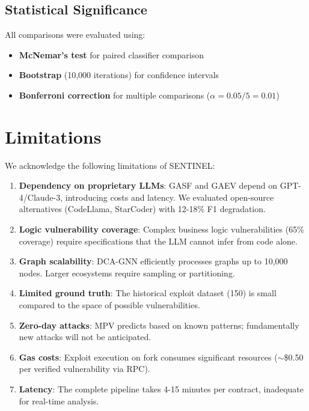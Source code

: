 \documentclass[11pt]{article}
\theoremstyle{definition}
\theoremstyle{plain}
\theoremstyle{remark}
\begin{document}
\subsection{Statistical Significance}

All comparisons were evaluated using:
\begin{itemize}
    \item \textbf{McNemar's test} for paired classifier comparison
    \item \textbf{Bootstrap} (10,000 iterations) for confidence intervals
    \item \textbf{Bonferroni correction} for multiple comparisons ($\alpha = 0.05/5 = 0.01$)
\end{itemize}

\section{Limitations}
\label{sec:limitations}

We acknowledge the following limitations of SENTINEL:

\begin{enumerate}
    \item \textbf{Dependency on proprietary LLMs}: GASF and GAEV depend on GPT-4/Claude-3, introducing costs and latency. We evaluated open-source alternatives (CodeLlama, StarCoder) with 12-18\% F1 degradation.
    
    \item \textbf{Logic vulnerability coverage}: Complex business logic vulnerabilities (65\% coverage) require specifications that the LLM cannot infer from code alone.
    
    \item \textbf{Graph scalability}: DCA-GNN efficiently processes graphs up to 10,000 nodes. Larger ecosystems require sampling or partitioning.
    
    \item \textbf{Limited ground truth}: The historical exploit dataset (150) is small compared to the space of possible vulnerabilities.
    
    \item \textbf{Zero-day attacks}: MPV predicts based on known patterns; fundamentally new attacks will not be anticipated.
    
    \item \textbf{Gas costs}: Exploit execution on fork consumes significant resources ($\sim$\$0.50 per verified vulnerability via RPC).
    
    \item \textbf{Latency}: The complete pipeline takes 4-15 minutes per contract, inadequate for real-time analysis.
\end{enumerate}
\end{document}
